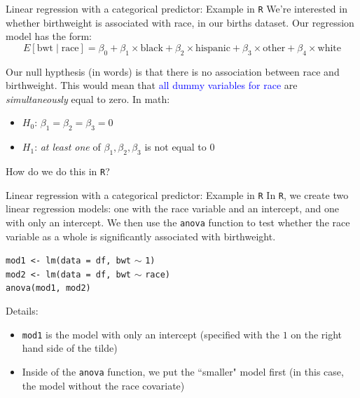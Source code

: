 \documentclass[10pt,t]{beamer}
\begin{document}
\begin{frame}{Linear regression with a categorical predictor: Example in \texttt{R}}
We're interested in whether birthweight is associated with race, in our births dataset. Our regression model has the form:
$$
E[\text{bwt} \mid \text{race}] = \beta_0 + \beta_1 \times \text{black} + \beta_2 \times \text{hispanic} + \beta_3 \times \text{other} + \beta_4 \times \text{white}
$$ \pause

Our null hypthesis (in words) is that there is no association between race and birthweight. This would mean that \textcolor{blue}{all dummy variables for race} are \textit{simultaneously} equal to zero. \pause In math:

\vspace{0.3cm}

\begin{itemize}
	\item $H_0$: $\beta_1 = \beta_2 = \beta_3 = 0$
	\item $H_1$: \textit{at least one} of $\beta_1, \beta_2, \beta_3$ is not equal to $0$
\end{itemize} \pause

\vspace{0.3cm}

How do we do this in \texttt{R}?

\end{frame}

\begin{frame}{Linear regression with a categorical predictor: Example in \texttt{R}}
In \texttt{R}, we create two linear regression models: one with the race variable and an intercept, and one with only an intercept. We then use the \texttt{anova} function to test whether the race variable as a whole is significantly associated with birthweight.

\vspace{0.3cm}

\texttt{mod1 <- lm(data = df, bwt} $\sim$ \texttt{1) \\
	mod2 <- lm(data = df, bwt} $\sim$ \texttt{race) \\
	anova(mod1, mod2)} \pause

\vspace{0.3cm}

Details:
\begin{itemize}
	\item \texttt{mod1} is the model with only an intercept (specified with the $1$ on the right hand side of the tilde)
	\item Inside of the \texttt{anova} function, we put the ``smaller" model first (in this case, the model without the race covariate)
\end{itemize}
\end{frame}
\end{document}
